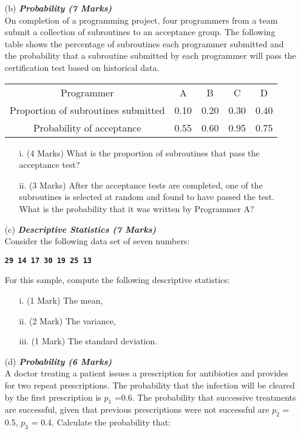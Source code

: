 \documentclass[]{article}
\begin{document}
\begin{itemize}
\item[(b)] \textbf{\textit{Probability (7 Marks)}}\\ 
On completion of a programming project, four programmers from a team submit a collection of subroutines to an acceptance group. The following table shows the percentage of subroutines each programmer submitted and the probability that a subroutine submitted by each programmer will pass the certification test based on historical data.
\begin{center}
\begin{tabular}{|c||c|c|c|c|}
\hline
Programmer	&A	&B	&C	&D\\
Proportion of subroutines submitted &	0.10&	0.20&	0.30&	0.40\\
Probability of acceptance	&0.55	&0.60	&0.95&	0.75\\
\hline
\end{tabular}
\end{center}
\begin{itemize}
\item[i.](4 Marks) What is the proportion of subroutines that pass the acceptance test?
\item[ii.](3 Marks) After the acceptance tests are completed, one of the subroutines is selected at random and found to have passed the test. What is the probability that it was written by Programmer A?
\end{itemize}
\item[(c)] \textbf{\textit{Descriptive Statistics (7 Marks)}}\\ 
Consider the following data set of seven numbers:

\begin{center}
\textbf{\texttt{29 14 17 30 19 25 13}}
\end{center}

\noindent For this sample, compute the following descriptive statistics:
\begin{itemize}
\item[i.] (1 Mark) The mean,
\item[ii.] (2 Mark) The variance,
\item[iii.] (1 Mark) The standard deviation.
\end{itemize}
\newpage
\item[(d)] \textbf{\textit{Probability (6 Marks)}}\\ 
A doctor treating a patient issues a prescription for antibiotics and provides for two repeat prescriptions. The probability that the infection will be cleared by the first prescription is $p_1$ =0.6.
The probability that successive treatments are successful, given that previous prescriptions were not successful are $p_2$ = 0.5, $p_3$ = 0.4. Calculate the probability that:


\end{itemize}
\end{document}
